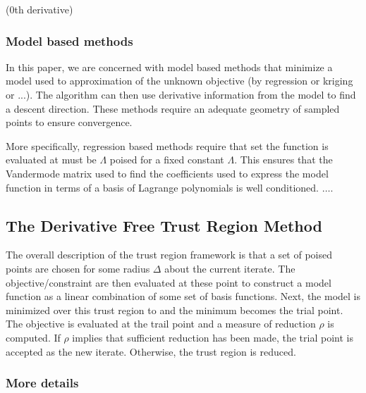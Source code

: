 \documentclass{article}
\begin{document}
(0th derivative)

\subsubsection{Model based methods}
In this paper, we are concerned with model based methods that minimize a model used to approximation of the unknown objective (by regression or kriging or ...).
The algorithm can then use derivative information from the model to find a descent direction.
These methods require an adequate geometry of sampled points to ensure convergence.

More specifically, regression based methods require that set the function is evaluated at must be $\Lambda$ poised for a fixed constant $\Lambda$.
This ensures that the Vandermode matrix used to find the coefficients used to express the model function in terms of a basis of Lagrange polynomials is well conditioned.
$\dots$.




\subsection{The Derivative Free Trust Region Method}

The overall description of the trust region framework is that a set of poised points are chosen for some radius $\Delta$ about the current iterate.
The objective/constraint are then evaluated at these point to construct a model function as a linear combination of some set of basis functions.
Next, the model is minimized over this trust region to and the minimum becomes the trial point.
The objective is evaluated at the trail point and a measure of reduction $\rho$ is computed.
If $\rho$ implies that sufficient reduction has been made, the trial point is accepted as the new iterate.
Otherwise, the trust region is reduced.

\subsubsection{More details}
\end{document}
